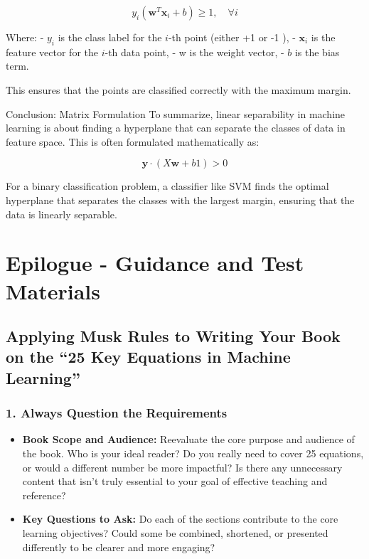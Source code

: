 \documentclass[
  12 pt,
  a4paper,
]{book}
\providecommand{\tightlist}{%
  \setlength{\itemsep}{0pt}\setlength{\parskip}{0pt}}
\numberwithin{equation}{section}
\theoremstyle{plain}      %
\theoremstyle{definition} %
\theoremstyle{remark}     %
\theoremstyle{note}         %
\begin{document}
\[
y_i\left(\mathbf{w}^T \mathbf{x}_i+b\right) \geq 1, \quad \forall i
\]

Where: - \(y_i\) is the class label for the \(i\)-th point (either +1 or
-1 ), - \(\mathbf{x}_i\) is the feature vector for the \(i\)-th data
point, - w is the weight vector, - \(b\) is the bias term.

This ensures that the points are classified correctly with the maximum
margin.

Conclusion: Matrix Formulation To summarize, linear separability in
machine learning is about finding a hyperplane that can separate the
classes of data in feature space. This is often formulated
mathematically as:

\[
\mathbf{y} \cdot(X \mathbf{w}+b 1)>0
\]

For a binary classification problem, a classifier like SVM finds the
optimal hyperplane that separates the classes with the largest margin,
ensuring that the data is linearly separable.

\newpage

\hypertarget{epilogue---guidance-and-test-materials}{%
\chapter{Epilogue - Guidance and Test
Materials}\label{epilogue---guidance-and-test-materials}}

\hypertarget{applying-musk-rules-to-writing-your-book-on-the-25-key-equations-in-machine-learning}{%
\section*{Applying Musk Rules to Writing Your Book on the ``25 Key
Equations in Machine
Learning''}\label{applying-musk-rules-to-writing-your-book-on-the-25-key-equations-in-machine-learning}}

\hypertarget{always-question-the-requirements}{%
\subsection*{\texorpdfstring{1. \textbf{Always Question the
Requirements}}{1. Always Question the Requirements}}\label{always-question-the-requirements}}

\begin{itemize}
\tightlist
\item
  \textbf{Book Scope and Audience:} Reevaluate the core purpose and
  audience of the book. Who is your ideal reader? Do you really need to
  cover 25 equations, or would a different number be more impactful? Is
  there any unnecessary content that isn't truly essential to your goal
  of effective teaching and reference?
\item
  \textbf{Key Questions to Ask:} Do each of the sections contribute to
  the core learning objectives? Could some be combined, shortened, or
  presented differently to be clearer and more engaging?
\end{itemize}
\end{document}
